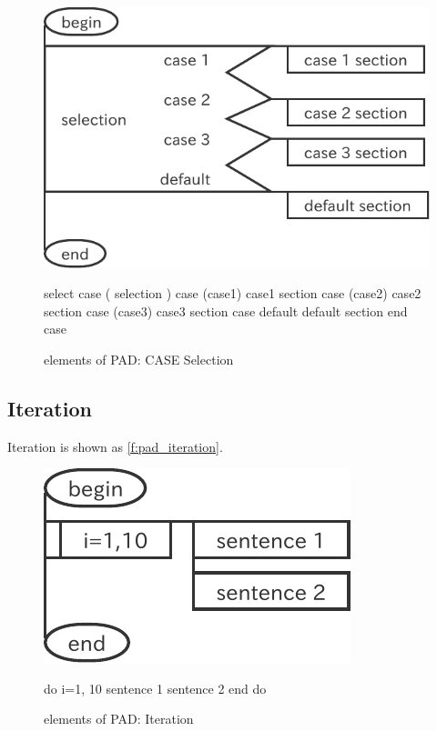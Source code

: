 \begin{figure}[htbp]
\begin{minipage}{.6\textwidth}
 \center
  \includegraphics[scale=0.7]{figs/pad_selection.pdf}
\end{minipage}
\begin{minipage}{.4\textwidth}
\begin{LstF90}[numbers=none]
 select case ( selection )
 case (case1)
   case1 section
 case (case2)
   case2 section
 case (case3)
   case3 section
 case default
   default section
 end case
\end{LstF90}
\end{minipage}
\caption{elements of PAD: CASE Selection}
\label{f:pad_case}
\end{figure}

\subsection{Iteration}

Iteration is shown as \autoref{f:pad_iteration}.

\begin{figure}[htbp]
\begin{minipage}{.49\textwidth}
 \center
  \includegraphics[scale=0.7]{figs/pad_iteration.pdf}
\end{minipage}
\begin{minipage}{.49\textwidth}
\begin{LstF90}[numbers=none]
 do i=1, 10
   sentence 1
   sentence 2
 end do
\end{LstF90}
\end{minipage}
\caption{elements of PAD: Iteration}
\label{f:pad_iteration}
\end{figure}


